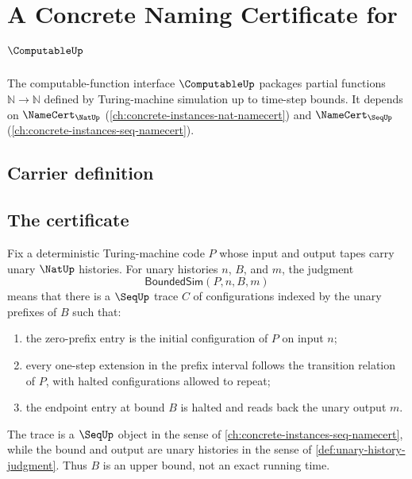 \chapter{A Concrete Naming Certificate for $\ComputableUp$}
\label{ch:concrete-instances-computable-namecert}

The computable-function interface $\ComputableUp$ packages partial functions $\mathbb{N} \to \mathbb{N}$ defined by Turing-machine simulation up to time-step bounds. It depends on $\NameCert_{\NatUp}$ (\autoref{ch:concrete-instances-nat-namecert}) and $\NameCert_{\SeqUp}$ (\autoref{ch:concrete-instances-seq-namecert}).

\section{Carrier definition}
\label{sec:computable-carrier}

\section{The certificate}
\label{sec:computable-certificate}

\begin{definition}
\label{def:computable-bounded-simulation-witness}
Fix a deterministic Turing-machine code $P$ whose input and output tapes carry unary $\NatUp$ histories. For unary histories $n$, $B$, and $m$, the judgment
$$
  \mathsf{BoundedSim}(P,n,B,m)
$$
means that there is a $\SeqUp$ trace $C$ of configurations indexed by the unary prefixes of $B$ such that:
\begin{enumerate}
  \item the zero-prefix entry is the initial configuration of $P$ on input $n$;
  \item every one-step extension in the prefix interval follows the transition relation of $P$, with halted configurations allowed to repeat;
  \item the endpoint entry at bound $B$ is halted and reads back the unary output $m$.
\end{enumerate}
The trace is a $\SeqUp$ object in the sense of \autoref{ch:concrete-instances-seq-namecert}, while the bound and output are unary histories in the sense of \autoref{def:unary-history-judgment}. Thus $B$ is an upper bound, not an exact running time.
\end{definition}

